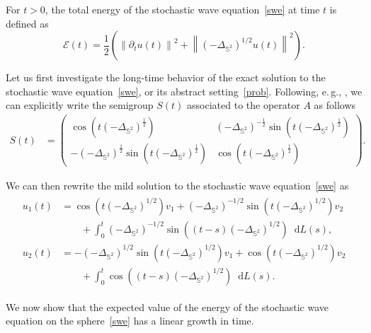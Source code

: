 \documentclass[11pt]{amsart}
\newcommand{\IS}{\mathbb{S}}
\providecommand{\norm}[1]{\left\lVert#1\right\rVert}
\newcommand*\dd{\mathop{}\!\mathrm{d}}
\newcommand{\Deltalb}{\Delta_{\IS^2}}
\begin{document}
For $t>0$, the total energy of the stochastic wave equation~\eqref{swe} at time $t$ is defined as
\begin{equation}\label{swe-energy}
\mathcal{E}(t)=\frac12\left(\norm{\partial_t u(t)}^2+\norm{(-\Deltalb)^{1/2}u(t)}^2\right).
\end{equation}

Let us first investigate the long-time behavior of the exact solution to the stochastic wave equation~\eqref{swe}, or its abstract setting~\eqref{prob}. Following, e.\,g., \cite{MR4462619}, we can explicitly write the semigroup $S(t)$ associated to the operator $A$ as follows
\begin{align}\label{sg_wave}
S(t)&=\begin{pmatrix}
\cos(t(-\Delta_{\IS^2})^{\frac12}) & 
(-\Delta_{\IS^2})^{-\frac12}\sin(t(-\Delta_{\IS^2})^{\frac12})\\
-(-\Delta_{\IS^2})^{\frac12}\sin(t(-\Delta_{\IS^2})^{\frac12}) & 
\cos(t(-\Delta_{\IS^2})^{\frac12})
\end{pmatrix}.
\end{align}

We can then rewrite the mild solution to the stochastic wave equation~\eqref{swe} as
\begin{align}
	\label{eqn:SWE_soln}
	\begin{split}
u_1(t)&=\cos(t(-\Deltalb)^{1/2})v_1+(-\Deltalb)^{-1/2}\sin(t(-\Deltalb)^{1/2})v_2\\
&\qquad+\int_0^t(-\Deltalb)^{-1/2}\sin((t-s)(-\Deltalb)^{1/2})\dd L(s),\\
u_2(t)&=-(-\Deltalb)^{1/2}\sin(t(-\Deltalb)^{1/2})v_1+\cos(t(-\Deltalb)^{1/2})v_2\\
&\qquad+\int_0^t\cos((t-s)(-\Deltalb)^{1/2})\dd L(s).
	\end{split}
\end{align}

We now show that the expected value of the energy of the stochastic wave equation on the sphere~\eqref{swe} has a linear growth in time.
\end{document}
